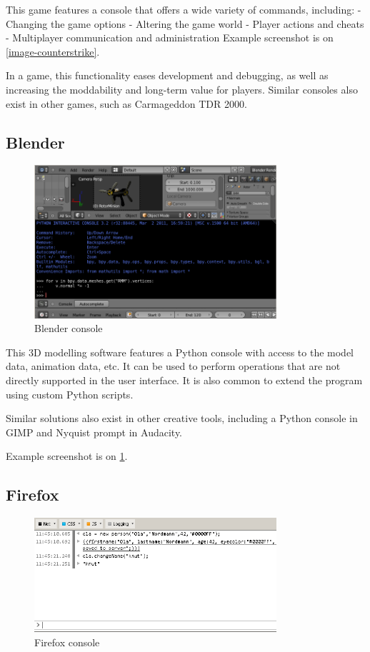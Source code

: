 This game features a console that offers a wide variety of commands, including:
- Changing the game options
- Altering the game world
- Player actions and cheats
- Multiplayer communication and administration
Example screenshot is on \ref{image-counterstrike}.

In a game, this functionality eases development and debugging, as well as increasing the moddability and long-term value for players. Similar consoles also exist in other games, such as Carmageddon TDR 2000.

\subsection{Blender}

\begin{figure}
\centering
\includegraphics[width = 0.8\textwidth]{image/blender.png}
\caption{Blender console}
\label{image-blender}
\end{figure}

This 3D modelling software features a Python console with access to the model data, animation data, etc. It can be used to perform operations that are not directly supported in the user interface. It is also common to extend the program using custom Python scripts. 

Similar solutions also exist in other creative tools, including a Python console in GIMP and Nyquist prompt in Audacity.

Example screenshot is on \ref{image-blender}.

\subsection{Firefox}

\begin{figure}
\centering
\includegraphics[width = 0.8\textwidth]{image/firefox.png}
\caption{Firefox console}
\label{image-firefox}
\end{figure}


